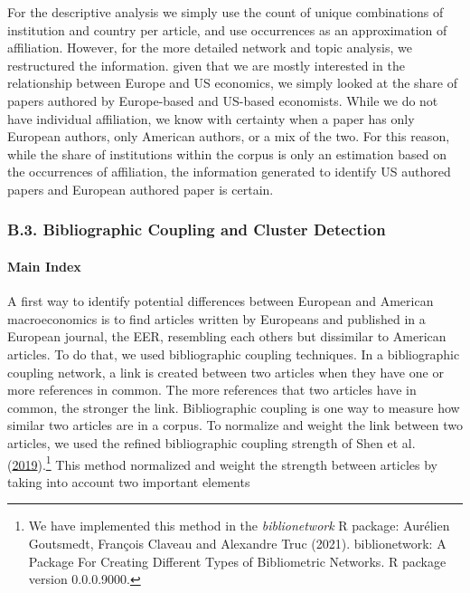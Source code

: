 \documentclass[
  12pt,
  onecolumn]{article}
\begin{document}
For the descriptive analysis we simply use the count of unique
combinations of institution and country per article, and use occurrences
as an approximation of affiliation. However, for the more detailed
network and topic analysis, we restructured the information. given that
we are mostly interested in the relationship between Europe and US
economics, we simply looked at the share of papers authored by
Europe-based and US-based economists. While we do not have individual
affiliation, we know with certainty when a paper has only European
authors, only American authors, or a mix of the two. For this reason,
while the share of institutions within the corpus is only an estimation
based on the occurrences of affiliation, the information generated to
identify US authored papers and European authored paper is certain.

\hypertarget{network}{%
\subsubsection*{B.3. Bibliographic Coupling and Cluster
Detection}\label{network}}

\hypertarget{main-index}{%
\paragraph*{Main Index}\label{main-index}}

A first way to identify potential differences between European and
American macroeconomics is to find articles written by Europeans and
published in a European journal, the EER, resembling each others but
dissimilar to American articles. To do that, we used bibliographic
coupling techniques. In a bibliographic coupling network, a link is
created between two articles when they have one or more references in
common. The more references that two articles have in common, the
stronger the link. Bibliographic coupling is one way to measure how
similar two articles are in a corpus. To normalize and weight the link
between two articles, we used the refined bibliographic coupling
strength of Shen et al.
(\protect\hyperlink{ref-shen2019}{2019}).\footnote{We have implemented
  this method in the \emph{biblionetwork} R package: Aurélien Goutsmedt,
  François Claveau and Alexandre Truc (2021). biblionetwork: A Package
  For Creating Different Types of Bibliometric Networks. R package
  version 0.0.0.9000.} This method normalized and weight the strength
between articles by taking into account two important elements
\end{document}
